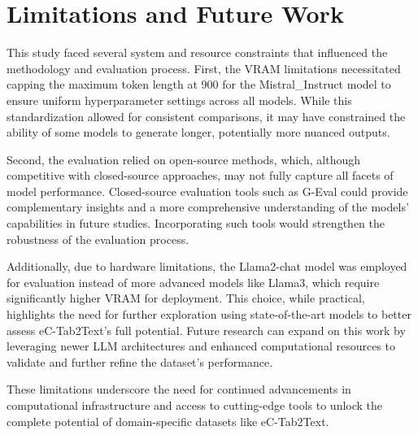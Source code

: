 \section{Limitations and Future Work}
This study faced several system and resource constraints that influenced the methodology and evaluation process. First, the VRAM limitations necessitated capping the maximum token length at 900 for the Mistral\_Instruct model to ensure uniform hyperparameter settings across all models. While this standardization allowed for consistent comparisons, it may have constrained the ability of some models to generate longer, potentially more nuanced outputs.

Second, the evaluation relied on open-source methods, which, although competitive with closed-source approaches, may not fully capture all facets of model performance. Closed-source evaluation tools such as G-Eval\citep{liu2023gevalnlgevaluationusing} could provide complementary insights and a more comprehensive understanding of the models' capabilities in future studies. Incorporating such tools would strengthen the robustness of the evaluation process.

Additionally, due to hardware limitations, the Llama2-chat model was employed for evaluation instead of more advanced models like Llama3, which require significantly higher VRAM for deployment. This choice, while practical, highlights the need for further exploration using state-of-the-art models to better assess eC-Tab2Text's full potential. Future research can expand on this work by leveraging newer LLM architectures and enhanced computational resources to validate and further refine the dataset's performance.

These limitations underscore the need for continued advancements in computational infrastructure and access to cutting-edge tools to unlock the complete potential of domain-specific datasets like eC-Tab2Text.
